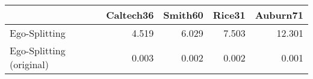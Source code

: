 \begin{tabular}{lrrrr}
\toprule
{} & Caltech36 & Smith60 & Rice31 & Auburn71 \\
\midrule
Ego-Splitting            &     4.519 &   6.029 &  7.503 &   12.301 \\
Ego-Splitting (original) &     0.003 &   0.002 &  0.002 &    0.001 \\
\bottomrule
\end{tabular}
